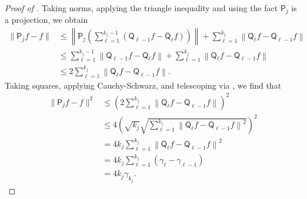 \documentclass[10pt,a4paper]{amsart}
\begin{document}
\begin{proof}[Proof of ]
    Taking norms, applying the triangle inequality and using the fact $\mathsf{P}_j$ is a projection, we obtain
\begin{align*}
    \| \mathsf{P}_j f-f\|&\leq \left\| \mathsf{P}_{j}\left(\sum_{\ell=1}^{k_j-1} (\mathsf{Q}_{{\ell-1}} f-\mathsf{Q}_{{\ell}} f)\right)\right\|+\sum_{\ell=1}^{k_j} \left\|\mathsf{Q}_{{\ell}} f -  \mathsf{Q}_{{\ell-1}} f\right\|\\
    &\leq  \sum_{\ell=1}^{k_j-1} \left\|\mathsf{Q}_{{\ell-1}} f-\mathsf{Q}_{{\ell}} f\right\|+\sum_{\ell=1}^{k_j} \left\|\mathsf{Q}_{{\ell}} f -  \mathsf{Q}_{{\ell-1}} f\right\|\\
    &\leq 2 \sum_{\ell=1}^{k_j} \left\|\mathsf{Q}_{{\ell}} f -  \mathsf{Q}_{{\ell-1}} f\right\|.
\end{align*}
Taking squares, applying Cauchy-Schwarz, and telescoping via , we find that
\begin{align*}
    \| \mathsf{P}_j f-f\|^2&\leq \left(2 \sum_{\ell=1}^{k_j} \left\|\mathsf{Q}_{{\ell}} f -  \mathsf{Q}_{{\ell-1}} f\right\|\right)^2\\
    &\leq 4\left(\sqrt{k_j}\sqrt{\sum_{\ell=1}^{k_j} \left\|\mathsf{Q}_{{\ell}} f -  \mathsf{Q}_{{\ell-1}} f\right\|^2}\right)^2\\
    &=4k_j\sum_{\ell=1}^{k_j} \left\|\mathsf{Q}_{{\ell}} f -  \mathsf{Q}_{{\ell-1}} f\right\|^2\\
    &=4k_j\sum_{\ell=1}^{k_j} (\gamma_{\ell}-\gamma_{\ell-1})\\
    &=4k_j\gamma_{k_j}.
\end{align*}


\end{proof}
\end{document}
